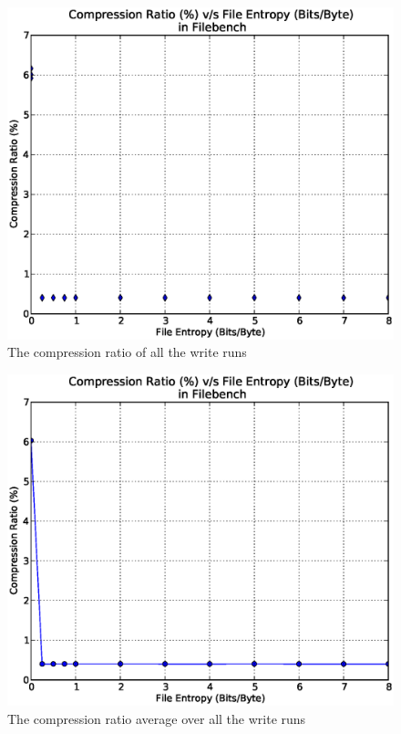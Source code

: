 \begin{figure}[H]
\begin{center}
\includegraphics[scale=.55]{../results/set2/write_comp_2.eps}
\caption{The compression ratio of all the write runs}
\label{fig:comp2}
\end{center}
\end{figure}


\begin{figure}[H]
\begin{center}
\includegraphics[scale=.55]{../results/set2/write_comp_avg_2.eps}
\caption{The compression ratio average over all the write runs}
\label{fig:compavg2}
\end{center}
\end{figure}

